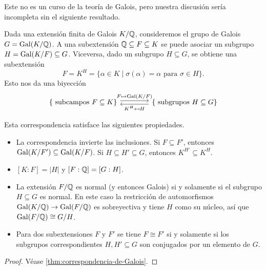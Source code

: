 Este no es un curso de la teoría de Galois, pero nuestra discusión sería
incompleta sin el siguiente resultado.

\begin{teorema}
  Dada una extensión finita de Galois $K/\mathbb{Q}$, consideremos el grupo de Galois
  $G = \operatorname{Gal} (K/\mathbb{Q})$.  A una subextensión $\mathbb{Q} \subseteq F \subseteq K$ se puede
  asociar un subgrupo $H = \operatorname{Gal} (K/F) \subseteq G$. Viceversa, dado un subgrupo
  $H \subseteq G$, se obtiene una subextensión
  $$F = K^H = \{ \alpha \in K \mid \sigma (\alpha) = \alpha \text{ para }\sigma\in H \}.$$
  Esto nos da una biyección
  \[ \begin{tikzcd}[column sep=4em]
    \{ \text{ subcampos }F \subseteq K \}
    \ar[shift left=0.25em]{r}{F \mapsto \Gal (K/F)} &
    \{ \text{ subgrupos }H \subseteq G \}
    \ar[shift left=0.25em]{l}{K^H \mapsfrom H}
  \end{tikzcd} \]

  Esta correspondencia satisface las siguientes propiedades.
  \begin{itemize}
  \item La correspondencia invierte las inclusiones.
    Si $F \subseteq F'$, entonces $\operatorname{Gal} (K/F') \subseteq \operatorname{Gal} (K/F)$.
    Si $H \subseteq H' \subseteq G$, entonces $K^{H'} \subseteq K^H$.

  \item $[K:F] = |H|$ y $[F:\mathbb{Q}] = [G:H]$.

  \item La extensión $F/\mathbb{Q}$ es normal (y entonces Galois) si y solamente si el
    subgrupo $H \subseteq G$ es normal. En este caso la restricción de
    automorfismos $\operatorname{Gal} (K/\mathbb{Q}) \to \operatorname{Gal} (F/\mathbb{Q})$ es sobreyectiva y tiene $H$
    como su núcleo, así que $\operatorname{Gal} (F/\mathbb{Q}) \cong G/H$.

  \item Para dos subextensiones $F$ y $F'$ se tiene $F\cong F'$ si y solamente
    si los subgrupos correspondientes $H, H' \subseteq G$ son conjugados por un
    elemento de $G$.
  \end{itemize}

  \begin{proof}
    Véase \ref{thm:correspondencia-de-Galois}.
  \end{proof}
\end{teorema}

